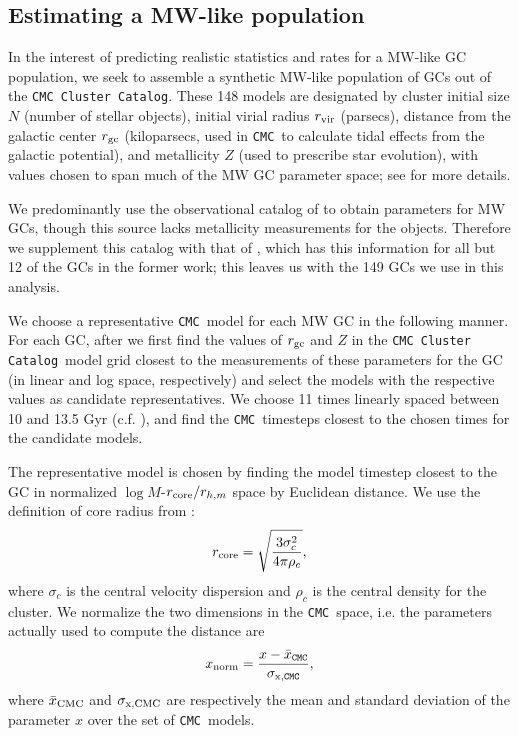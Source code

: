 \documentclass[twocolumn]{aastex631}
\newcommand{\CMC}{\texttt{CMC}}
\newcommand{\CMCcat}{\texttt{CMC Cluster Catalog}}
\begin{document}
\subsection{Estimating a MW-like population} \label{subsec:est_MW-like}


In the interest of predicting realistic statistics and rates for a MW-like GC population, we seek to assemble a synthetic MW-like population of GCs out of the \CMCcat.
These 148 models are designated by cluster initial size $N$ (number of stellar objects), initial virial radius $r_{\rm vir}$ (parsecs), distance from the galactic center $r_{\rm gc}$ (kiloparsecs, used in \CMC\ to calculate tidal effects from the galactic potential), and metallicity $Z$ (used to prescribe star evolution), with values chosen to span much of the MW GC parameter space; see \citet{2020IAUS..351..357K} for more details.

We predominantly use the observational catalog of \citet{2018MNRAS.478.1520B} to obtain parameters for MW GCs, though this source lacks metallicity measurements for the objects.
Therefore we supplement this catalog with that of \citet{2010arXiv1012.3224H}, which has this information for all but 12 of the GCs in the former work; this leaves us with the 149 GCs we use in this analysis.

We choose a representative \CMC\ model for each MW GC in the following manner.
For each GC, after \citet{2021ApJ...912..102R} we first find the values of $r_{\rm gc}$ and $Z$ in the \CMCcat\ model grid closest to the measurements of these parameters for the GC (in linear and log space, respectively) and select the models with the respective values as candidate representatives.
We choose 11 times linearly spaced between 10 and 13.5 Gyr (c.f. \citet{2013ApJ...775..134V}), and find the \CMC\ timesteps closest to the chosen times for the candidate models.

The representative model is chosen by finding the model timestep closest to the GC in normalized $\log M$-$r_{\rm core} / r_{h,m}$ space by Euclidean distance.
We use the definition of core radius from \citet{1987degc.book.....S}:
\begin{equation}
    r_{\rm core} = \sqrt{\frac{3 \sigma_c^2}{4 \pi \rho_c}},
\end{equation}
where $\sigma_c$ is the central velocity dispersion and $\rho_c$ is the central density for the cluster.
We normalize the two dimensions in the \CMC\ space, i.e. the parameters actually used to compute the distance are
\begin{equation}
    x_{\rm norm} = \frac{x - \bar{x}_{\rm \CMC}}{\sigma_{\rm x, \CMC}},
\end{equation}
where $\bar{x}_{\rm CMC}$ and $\sigma_{\rm x,CMC}$ are respectively the mean and standard deviation of the parameter $x$ over the set of \CMC\ models.
\end{document}
